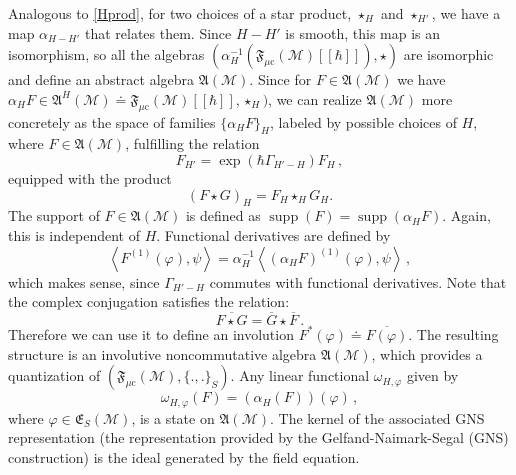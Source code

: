 \documentclass[12pt]{article}
\newcommand{\E}{\mathfrak{E}}
\newcommand{\fA}{\mathfrak{A}}
\newcommand{\F}{\mathfrak{F}}
\newcommand{\Mcal}{\mathcal{M}}
\DeclareMathOperator{\supp}{\mathrm{supp}}      %
\newcommand{\mc}{{\mu\mathrm{c}}}
\newcommand{\al}{\alpha}
\newcommand{\ph}{\varphi}
\newcommand{\om}{\omega}
\newcommand{\Poi}[2]{\{#1,#2\}}
\newcommand{\sst}[1]{\scriptscriptstyle{#1}}  %
\newcommand{\1}{\mathds{1}}                         %
\newcommand{\be}{\begin{equation}}
\newcommand{\ee}{\end{equation}}
\begin{document}
{{\begin{exa}
\end{exa}
Analogous to \eqref{Hprod}, for two choices of a star product, $\star_H$ and $\star_{H'}$, we have a map $\al_{H-H'} $ that relates them. Since $H-H'$ is smooth, this map is an isomorphism, so all the algebras $(\al_H^{-1}(\F_\mc(\Mcal)[[\hbar]]),\star)$ are isomorphic and define an abstract algebra $\fA(\Mcal)$. Since for $F \in \fA(\Mcal)$ we have $\al_HF\in \fA^{\sst H}(\Mcal)\doteq\F_{\mc}(\Mcal)[[\hbar]],\star_H)$, we can realize $\fA(\Mcal)$ more concretely as the space of families $\{ \al_HF \}_H$,  labeled by possible choices of $H$, where  $F \in \fA(\Mcal)$, fulfilling the relation
\[
 F_{H'} = \exp(\hbar \Gamma_{H'-H}) F_H\,,
\]
equipped with the product
\[
 (F \star G)_H = F_H \star_H G_H.
\]
The support of $F \in \fA(\Mcal)$ is defined as $\supp(F) = \supp(\al_HF)$. Again, this is independent of $H$. Functional derivatives are defined by
\[
\left<F^{(1)}(\ph),\psi\right> = \al_H^{-1}\left<(\al_HF)^{(1)}(\ph),\psi\right>\,,
\]
which makes sense, since $\Gamma_{H'-H}$ commutes with functional derivatives. Note that the complex conjugation satisfies the relation:
\be
\overline{F\star G}=\overline{G}\star\overline{F}\,.
\ee
Therefore we can use it to define an involution  $F^*(\ph)\doteq\overline{F(\ph)}$. The resulting structure is an involutive noncommutative algebra $\fA(\Mcal)$, which provides a quantization of $(\F_{\mc}(\Mcal),\Poi{.}{.}_S)$. Any linear functional $\omega_{H,\ph}$ given by
 \be\label{vacuum}
 \om_{H,\ph}(F)=(\al_H(F))(\ph)\,,
 \ee 
 where $\ph\in\E_S(\Mcal)$, is a state on $\fA(\Mcal)$. The kernel of the associated GNS representation  (the representation provided by the Gelfand-Naimark-Segal
 (GNS) construction) is the ideal generated by the field equation.

}}
\end{document}
